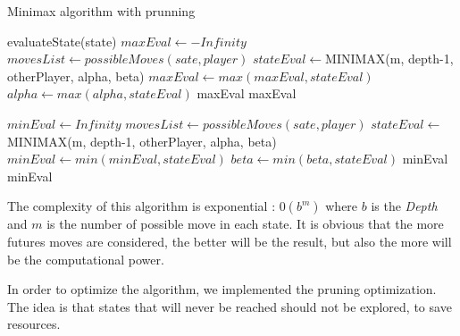 \documentclass{article}
\begin{document}
\begin{algorithm}[H] %
	\caption{Minimax algorithm with prunning}
    \label{alg:minimax}
	\begin{algorithmic}[1]
	            \Return evaluateState(state)
	       \EndIf
    	        \State $maxEval \gets -Infinity$
    	        \State $movesList \gets possibleMoves(sate, player)$
    	                \State $stateEval \gets $MINIMAX(m, depth-1, otherPlayer, alpha, beta)
                        \State $maxEval \gets max(maxEval, stateEval)$
                        \State $alpha \gets max(alpha, stateEval)$
                         \State \Return maxEval \EndIf
    	       \EndFor
    	       \State \Return maxEval

	       \Else
	            \State $minEval \gets Infinity$
    	        \State $movesList \gets possibleMoves(sate, player)$
    	       	     \State $stateEval \gets $ MINIMAX(m, depth-1, otherPlayer, alpha, beta)
                     \State $minEval \gets min(minEval, stateEval)$
                     \State $beta \gets min(beta, stateEval)$
                      \State \Return minEval \EndIf
    	       \EndFor
    	       \State \Return minEval
	       \EndIf

	      \EndFunction

	\end{algorithmic}
\end{algorithm}


The complexity of this algorithm is exponential : $0(b^m)$ where $b$ is the \textit{Depth} and $m$ is the number of possible move in each state.
It is obvious that the more futures moves are considered, the better will be the result, but also the more will be the computational power.


In order to optimize the algorithm, we implemented the pruning optimization. The idea is that states that will never be reached should not be explored, to save resources.
\end{document}
